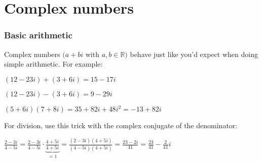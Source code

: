 \iffalse

MIT License

Copyright (c) 2023 Aron Hardeman

Permission is hereby granted, free of charge, to any person obtaining a copy
of this software and associated documentation files (the "Software"), to deal
in the Software without restriction, including without limitation the rights
to use, copy, modify, merge, publish, distribute, sublicense, and/or sell
copies of the Software, and to permit persons to whom the Software is
furnished to do so, subject to the following conditions:

The above copyright notice and this permission notice shall be included in all
copies or substantial portions of the Software.

THE SOFTWARE IS PROVIDED "AS IS", WITHOUT WARRANTY OF ANY KIND, EXPRESS OR
IMPLIED, INCLUDING BUT NOT LIMITED TO THE WARRANTIES OF MERCHANTABILITY,
FITNESS FOR A PARTICULAR PURPOSE AND NONINFRINGEMENT. IN NO EVENT SHALL THE
AUTHORS OR COPYRIGHT HOLDERS BE LIABLE FOR ANY CLAIM, DAMAGES OR OTHER
LIABILITY, WHETHER IN AN ACTION OF CONTRACT, TORT OR OTHERWISE, ARISING FROM,
OUT OF OR IN CONNECTION WITH THE SOFTWARE OR THE USE OR OTHER DEALINGS IN THE
SOFTWARE.

\fi
\section{Complex numbers}
\begin{frame}
\frametitle{Basic arithmetic}

Complex numbers $(a+bi$ with $a,b\in\mathbb{R})$ behave just like you'd expect when doing simple arithmetic. For example:

\pause $(12-23i) + (3+6i) = 15 -17i$

\pause $(12-23i) - (3+6i) = 9 -29i$

\pause $(5+6i)(7+8i) = 35+82i+48i^2 = -13+82i$

\pause For division, use this trick with the complex conjugate of the denominator:

$\frac{2-3i}{4-5i}=$\pause$\frac{2-3i}{4-5i}\cdot\underbrace{\frac{4+5i}{4+5i}}_{=1} $\pause$= \frac{(2-3i)(4+5i)}{(4-5i)(4+5i)}$\pause$=\frac{23-2i}{41}$\pause$=\boxed{\frac{23}{41}-\frac{2}{41}i}$


\end{frame}

